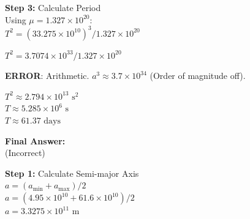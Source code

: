 \begin{minipage}{\linewidth}
\begin{tcolorbox}[
    title={\textbf{IPhO 2013 Q1}},
    colback=white,
    colframe=gray!50!black,
    arc=3pt,
    boxrule=1pt,
    fonttitle=\sffamily\large,
    width=\linewidth
]
\begin{minipage}[t]{0.49\linewidth}
\begin{tcolorbox}
            \textbf{\textcolor{blue!60!black}{Step 3:}} Calculate Period\\
            Using $\mu = 1.327 \times 10^{20}$:\\
            $T^2 = (33.275 \times 10^{10})^3 / 1.327 \times 10^{20}$
            \vspace{0.5em}
            
            $T^2 = 3.7074 \times 10^{33} / 1.327 \times 10^{20}$
            
            \vspace{0.3em}
            \colorbox{red!15}{\parbox{\linewidth}{\textcolor{red!80!black}{\textbf{ERROR}: Arithmetic. $a^3 \approx 3.7 \times 10^{34}$ (Order of magnitude off).}}}
            \vspace{0.3em}
            
            $T^2 \approx 2.794 \times 10^{13}\text{ s}^2$\\
            $T \approx 5.285 \times 10^6\text{ s}$\\
            $T \approx 61.37\text{ days}$
            \vspace{1em}
            
            \textbf{Final Answer:}\\\vspace{1em}
             (Incorrect)
        \end{tcolorbox}
    \end{minipage}%
    \hfill
    \begin{minipage}[t]{0.49\linewidth}
        \vspace{0pt}
        \begin{tcolorbox}[
            title={\small \textbf{RL-FINETUNED MODEL}},
            colframe=green!50!black,
            colback=green!5!white,
            coltitle=white,
            fontupper=\small\ttfamily\raggedright,
            boxrule=0.5pt,
            sharp corners,
            left=2pt, right=2pt,
            width=\linewidth,
            nobeforeafter
        ]
            \textbf{\textcolor{green!40!black}{Step 1:}} Calculate Semi-major Axis\\
            $a = (a_{\min} + a_{\max}) / 2$\\
            $a = (4.95 \times 10^{10} + 61.6 \times 10^{10}) / 2$\\
            $a = 3.3275 \times 10^{11}\text{ m}$
            \vspace{1em}
            

\end{tcolorbox}
\end{minipage}
\end{tcolorbox}
\end{minipage}
